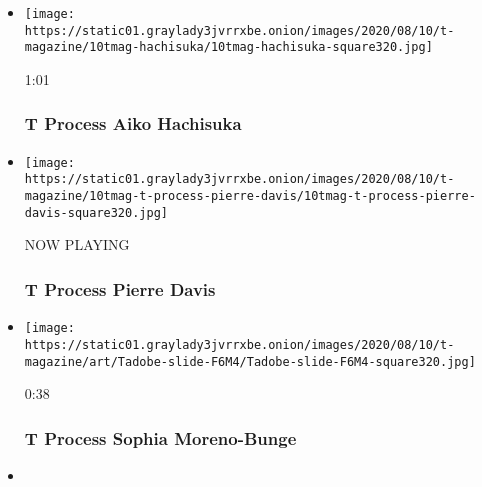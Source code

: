 \begin{itemize}
\item
  \href{https://www.nytimes3xbfgragh.onion/video/t-magazine/100000007260935/t-process-aiko-hachisuka.html?action=click\&module=video-series-bar\&region=header\&pgtype=Article\&playlistId=video/t-process}{}

  \texttt{[image: https://static01.graylady3jvrrxbe.onion/images/2020/08/10/t-magazine/10tmag-hachisuka/10tmag-hachisuka-square320.jpg]}

  1:01

  \hypertarget{t-process--aiko-hachisuka}{%
  \subsubsection{T Process \textbar{} Aiko
  Hachisuka}\label{t-process--aiko-hachisuka}}
\item
  \texttt{[image: https://static01.graylady3jvrrxbe.onion/images/2020/08/10/t-magazine/10tmag-t-process-pierre-davis/10tmag-t-process-pierre-davis-square320.jpg]}

  NOW PLAYING

  \hypertarget{t-process--pierre-davis-1}{%
  \subsubsection{T Process \textbar{} Pierre
  Davis}\label{t-process--pierre-davis-1}}
\item
  \href{https://www.nytimes3xbfgragh.onion/video/t-magazine/design/100000007258999/t-process-sophia-moreno-bunge.html?action=click\&module=video-series-bar\&region=header\&pgtype=Article\&playlistId=video/t-process}{}

  \texttt{[image: https://static01.graylady3jvrrxbe.onion/images/2020/08/10/t-magazine/art/Tadobe-slide-F6M4/Tadobe-slide-F6M4-square320.jpg]}

  0:38

  \hypertarget{t-process--sophia-moreno-bunge}{%
  \subsubsection{T Process \textbar{} Sophia
  Moreno-Bunge}\label{t-process--sophia-moreno-bunge}}
\item
  \href{https://www.nytimes3xbfgragh.onion/video/t-magazine/100000007129787/t-process-prada-galleria-bag.html?action=click\&module=video-series-bar\&region=header\&pgtype=Article\&playlistId=video/t-process}{}


\end{itemize}
